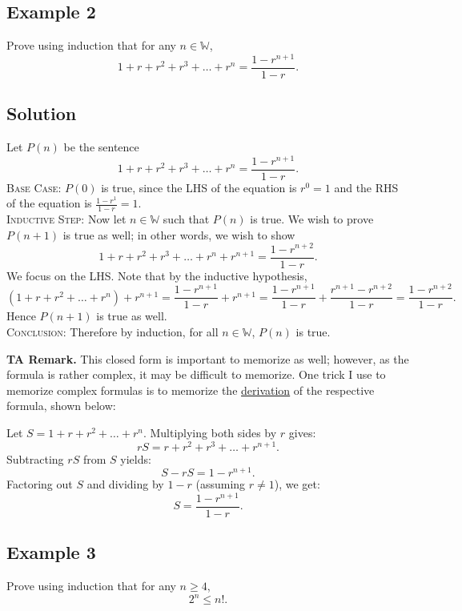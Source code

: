 \documentclass{article}
\begin{document}
\subsection*{Example 2}
    Prove using induction that for any $n \in \mathbb{W}$, $$1 + r + r^{2} + r^{3} + \dots + r^{n}= \frac{1 - r^{n + 1}}{1 - r}.$$

\subsection*{Solution}
    Let $P(n)$ be the sentence $$1 + r + r^{2} + r^{3} + \dots + r^{n}= \frac{1 - r^{n + 1}}{1 - r}.$$
    \textsc{Base Case}: $P(0)$ is true, since the LHS of the equation is $r^{0} = 1$ and the RHS of the equation is $\frac{1 - r^{1}}{1 - r} = 1.$ \\
    \textsc{Inductive Step}: Now let $n \in \mathbb{W}$ such that $P(n)$ is true. We wish to prove $P(n + 1)$ is true as well; in other words, we wish to show $$1 + r + r^{2} + r^{3} + \dots + r^{n} + r^{n + 1} = \frac{1 - r^{n + 2}}{1 - r}.$$ We focus on the LHS. Note that by the inductive hypothesis, $$(1 + r + r^{2} + \dots + r^{n}) + r^{n + 1} = \frac{1 - r^{n + 1}}{1 - r} + r^{n + 1} = \frac{1 - r^{n + 1}}{1 - r} + \frac{r^{n + 1} - r^{n + 2}}{1 - r} = \frac{1 - r^{n + 2}}{1 - r}.$$
    Hence $P(n + 1)$ is true as well. \\
    \textsc{Conclusion}: Therefore by induction, for all $n \in \mathbb{W}$, $P(n)$ is true.
    
    \vspace{1.5mm}
    \textbf{TA Remark.} This closed form is important to memorize as well; however, as the formula is rather complex, it may be difficult to memorize. One trick I use to memorize complex formulas is to memorize the \underline{derivation} of the respective formula, shown below:
    
    Let $S = 1 + r + r^{2} + \dots + r^{n}$. Multiplying both sides by $r$ gives:
    $$rS = r + r^{2} + r^{3} + \dots + r^{n + 1}.$$
    Subtracting $rS$ from $S$ yields:
    $$S - rS = 1 - r^{n + 1}.$$
    Factoring out $S$ and dividing by $1 - r$ (assuming $r \ne 1$), we get:
    $$S = \frac{1 - r^{n + 1}}{1 - r}.$$

\subsection*{Example 3}
    Prove using induction that for any $n \ge 4$, $$2^{n} \le n!.$$
\end{document}
